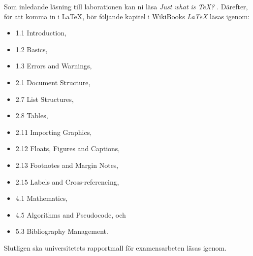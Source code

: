 Som inledande läsning till laborationen kan ni läsa \emph{Just what is \TeX?} 
\citep{TUG2011jwi}.
Därefter, för att komma in i \LaTeX, bör följande kapitel i WikiBooks 
\emph{\LaTeX} \citep{Wikibooks2012l} läsas igenom:
\begin{itemize}
	\item 1.1 Introduction,
	\item 1.2 Basics,
	\item 1.3 Errors and Warnings,
	\item 2.1 Document Structure,
	\item 2.7 List Structures,
	\item 2.8 Tables,
	\item 2.11 Importing Graphics,
	\item 2.12 Floats, Figures and Captions,
	\item 2.13 Footnotes and Margin Notes,
	\item 2.15 Labels and Cross-referencing,
	\item 4.1 Mathematics,
	\item 4.5 Algorithms and Pseudocode, och
	\item 5.3 Bibliography Management.
\end{itemize}

Slutligen ska universitetets rapportmall för examensarbeten \citep{MiUn2012rft} 
läsas igenom.
